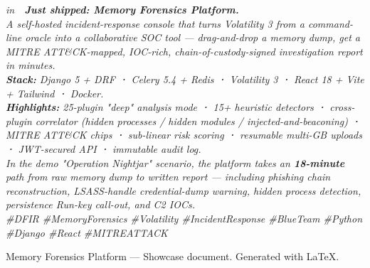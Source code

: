 \documentclass[11pt,a4paper]{article}
\providecommand{\faLinkedin}{in}%
\begin{document}
\begin{tcolorbox}[enhanced, colback=accent!6, colframe=accent,
  boxrule=0.6pt, arc=3pt, left=10pt, right=10pt, top=8pt, bottom=8pt]
\small\itshape
\faLinkedin\ \ \textbf{Just shipped: Memory Forensics Platform.}\\[6pt]
A self-hosted incident-response console that turns Volatility 3 from a
command-line oracle into a collaborative SOC tool — drag-and-drop a memory
dump, get a MITRE ATT\&CK-mapped, IOC-rich, chain-of-custody-signed
investigation report in minutes.\\[6pt]
\textbf{Stack:} Django 5 + DRF \textbf{·} Celery 5.4 + Redis \textbf{·}
Volatility 3 \textbf{·} React 18 + Vite + Tailwind \textbf{·} Docker.\\[4pt]
\textbf{Highlights:} 25-plugin "deep" analysis mode \textbf{·} 15+ heuristic
detectors \textbf{·} cross-plugin correlator (hidden processes / hidden
modules / injected-and-beaconing) \textbf{·} MITRE ATT\&CK chips
\textbf{·} sub-linear risk scoring \textbf{·} resumable multi-GB uploads
\textbf{·} JWT-secured API \textbf{·} immutable audit log.\\[4pt]
In the demo "Operation Nightjar" scenario, the platform takes an
\textbf{18-minute} path from raw memory dump to written report — including
phishing chain reconstruction, LSASS-handle credential-dump warning, hidden
process detection, persistence Run-key call-out, and C2 IOCs.\\[6pt]
\#DFIR \#MemoryForensics \#Volatility \#IncidentResponse \#BlueTeam
\#Python \#Django \#React \#MITREATTACK
\end{tcolorbox}

\vfill
\begin{center}\small\color{slate}
Memory Forensics Platform — Showcase document. Generated with \LaTeX.
\end{center}
\end{document}
